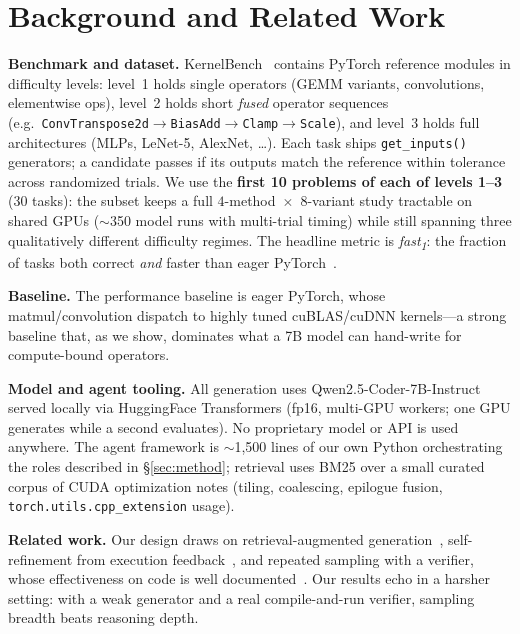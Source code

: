 \documentclass[conference]{IEEEtran}
\begin{document}
\section{Background and Related Work}

\textbf{Benchmark and dataset.} KernelBench~\cite{kernelbench} contains PyTorch
reference modules in difficulty levels: level~1 holds single operators (GEMM
variants, convolutions, elementwise ops), level~2 holds short \emph{fused} operator
sequences (e.g.\ \texttt{ConvTranspose2d}$\to$\allowbreak\texttt{BiasAdd}$\to$\allowbreak\texttt{Clamp}$\to$\allowbreak\texttt{Scale}), and
level~3 holds full architectures (MLPs, LeNet-5, AlexNet, \dots). Each task ships
\texttt{get\_inputs()} generators; a candidate passes if its outputs match the
reference within tolerance across randomized trials. We use the \textbf{first 10
problems of each of levels 1--3} (30 tasks): the subset keeps a full
$4$-method~$\times$~$8$-variant study tractable on shared GPUs ($\sim$350 model
runs with multi-trial timing) while still spanning three qualitatively different
difficulty regimes. The headline metric is \emph{fast\textsubscript{1}}: the
fraction of tasks both correct \emph{and} faster than eager PyTorch~\cite{kernelbench}.

\textbf{Baseline.} The performance baseline is eager PyTorch, whose
matmul/convolution dispatch to highly tuned cuBLAS/cuDNN kernels---a strong
baseline that, as we show, dominates what a 7B model can hand-write for
compute-bound operators.

\textbf{Model and agent tooling.} All generation uses
Qwen2.5-Coder-7B-Instruct~\cite{qwen25coder} served locally via HuggingFace
Transformers (fp16, multi-GPU workers; one GPU generates while a second evaluates).
No proprietary model or API is used anywhere. The agent framework is $\sim$1{,}500
lines of our own Python orchestrating the roles described in \S\ref{sec:method};
retrieval uses BM25 over a small curated corpus of CUDA optimization notes
(tiling, coalescing, epilogue fusion, \texttt{torch.utils.cpp\_extension} usage).

\textbf{Related work.} Our design draws on retrieval-augmented
generation~\cite{rag}, self-refinement from execution
feedback~\cite{selfrefine,selfdebug,reflexion}, and repeated sampling with a
verifier, whose effectiveness on code is well documented~\cite{alphacode,monkeys}.
Our results echo \cite{monkeys} in a harsher setting: with a weak generator and a
real compile-and-run verifier, sampling breadth beats reasoning depth.
\end{document}

